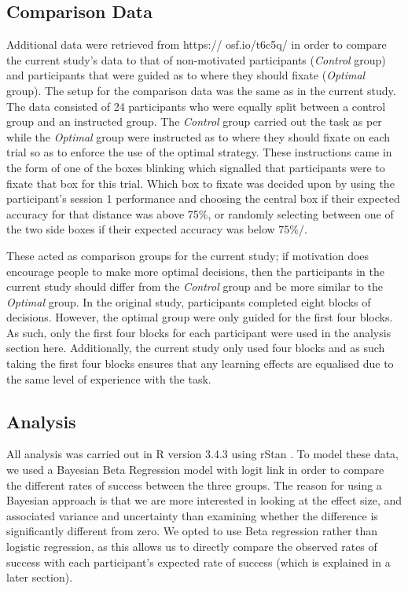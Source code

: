\documentclass[vision,article,submit,moreauthors,pdftex,10pt,a4paper]{mdpi}
\begin{document}
\subsection{Comparison Data}
Additional data were retrieved from https:// osf.io/t6c5q/ in order to compare the current study’s data to that of non-motivated participants (\textit{Control} group) and participants that were guided as to where they should fixate (\textit{Optimal} group). The setup for the comparison data was the same as in the current study. The data consisted of 24 participants who were equally split between a control group and an instructed group. The \textit{Control} group carried out the task as per \cite{clarke2015failure} while the \textit{Optimal} group were instructed as to where they should fixate on each trial so as to enforce the use of the optimal strategy. These instructions came in the form of one of the boxes blinking which signalled that participants were to fixate that box for this trial. Which box to fixate was decided upon by using the participant's session 1 performance and choosing the central box if their expected accuracy for that distance was above 75\%, or randomly selecting between one of the two side boxes if their expected accuracy was below 75\%/. 

These acted as comparison groups for the current study; if motivation does encourage people to make more optimal decisions, then the participants in the current study should differ from the \textit{Control} group and be more similar to the \textit{Optimal} group. In the original study, participants completed eight blocks of decisions. However, the optimal group were only guided for the first four blocks. As such, only the first four blocks for each participant were used in the analysis section here. Additionally, the current study only used four blocks and as such taking the first four blocks ensures that any learning effects are equalised due to the same level of experience with the task. %

\subsection{Analysis}
All analysis was carried out in R version 3.4.3 \cite{R} using rStan \cite{Rstan}. To model these data, we used a Bayesian Beta Regression model \cite{ferrari2004beta} with logit link in order to compare the different rates of success between the three groups. The reason for using a Bayesian approach is that we are more interested in looking at the effect size, and associated variance and uncertainty than examining whether the difference is significantly different from zero. We opted to use Beta regression rather than logistic regression, as this allows us to directly compare the observed rates of success with each participant’s expected rate of success (which is explained in a later section). 
\end{document}
